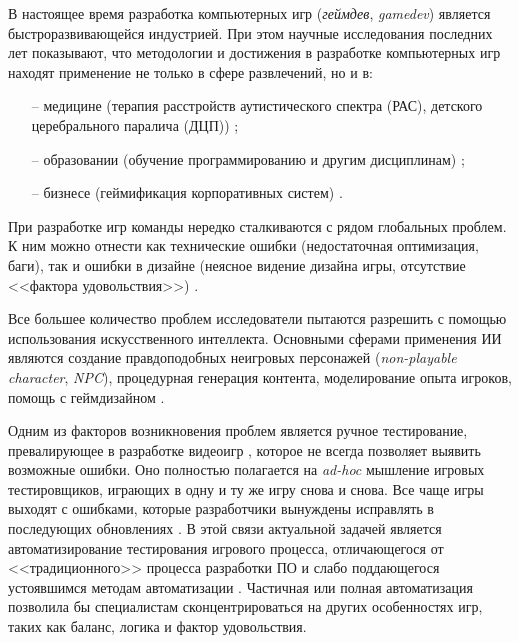 
В настоящее время разработка компьютерных игр (\textit{геймдев}, \textit{gamedev}) является быстроразвивающейся индустрией. При этом научные исследования последних лет показывают, что методологии и достижения в разработке компьютерных игр находят применение не только в сфере развлечений, но и в:
\begin{itemize}
	\item[--] медицине (терапия расстройств аутистического спектра (РАС), детского церебрального паралича (ДЦП)) \cite{lopes2018games,hassan2021serious};
	\item[--] образовании (обучение программированию и другим дисциплинам) \cite{vahldick2020blocks,mayer2019computer};
	\item[--] бизнесе (геймификация корпоративных систем) \cite{augustin2016we}.
\end{itemize}

При разработке игр команды нередко сталкиваются с рядом глобальных проблем. К ним можно отнести как технические ошибки (недостаточная оптимизация, баги), так и ошибки в дизайне (неясное видение дизайна игры, отсутствие <<фактора удовольствия>>) \cite{politowski2021game}.

Все большее количество проблем исследователи пытаются разрешить с помощью использования искусственного интеллекта. Основными сферами применения ИИ являются создание правдоподобных неигровых персонажей (\textit{non-playable character}, \textit{NPC}), процедурная генерация контента, моделирование опыта игроков, помощь с геймдизайном \cite{xia2020recent}.

Одним из факторов возникновения проблем является ручное тестирование, превалирующее в разработке видеоигр \cite{santos2018computer}, которое не всегда позволяет выявить возможные ошибки. Оно полностью полагается на \textit{ad-hoc} мышление игровых тестировщиков, играющих в одну и ту же игру снова и снова. Все чаще игры выходят с ошибками, которые разработчики вынуждены исправлять в последующих обновлениях \cite{truelove2021we}. В этой связи актуальной задачей является автоматизирование тестирования игрового процесса, отличающегося от <<традиционного>> процесса разработки ПО и слабо поддающегося устоявшимся методам автоматизации \cite{politowski2021game,murphy2014cowboys}. Частичная или полная автоматизация позволила бы специалистам сконцентрироваться на других особенностях игр, таких как баланс, логика и фактор удовольствия.

